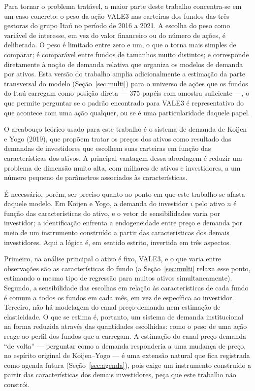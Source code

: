 \documentclass[12pt,a4paper]{article}
\begin{document}
Para tornar o problema tratável, a maior parte deste trabalho concentra-se em um caso concreto:
o peso da ação VALE3 nas carteiras dos fundos das três gestoras do grupo Itaú no período de 2016
a 2021. A escolha do peso como variável de interesse, em vez do valor financeiro ou do número de
ações, é deliberada. O peso é limitado entre zero e um, o que o torna mais simples de comparar;
é comparável entre fundos de tamanhos muito distintos; e corresponde diretamente à noção de
demanda relativa que organiza os modelos de demanda por ativos. Esta versão do trabalho amplia
adicionalmente a estimação da parte transversal do modelo (Seção~\ref{sec:multi}) para o
universo de ações que os fundos do Itaú carregam como posição direta --- 375 papéis com amostra
suficiente ---, o que permite perguntar se o padrão encontrado para VALE3 é representativo do
que acontece com uma ação qualquer, ou se é uma particularidade daquele papel.

O arcabouço teórico usado para este trabalho é o sistema de demanda de Koijen e Yogo (2019),
que propõem tratar os preços dos ativos como resultado das demandas de investidores que
escolhem suas carteiras em função das características dos ativos. A principal vantagem dessa
abordagem é reduzir um problema de dimensão muito alta, com milhares de ativos e investidores,
a um número pequeno de parâmetros associados às características.

É necessário, porém, ser preciso quanto ao ponto em que este trabalho se afasta daquele
modelo. Em Koijen e Yogo, a demanda do investidor $i$ pelo ativo $n$ é função das
características do ativo, e o vetor de sensibilidades varia por investidor; a identificação
enfrenta a endogeneidade entre preço e demanda por meio de um instrumento construído a partir
das características dos demais investidores. Aqui a lógica é, em sentido estrito, invertida em
três aspectos.

Primeiro, na análise principal o ativo é fixo, VALE3, e o que varia entre observações são as
características do fundo (a Seção~\ref{sec:multi} relaxa esse ponto, estimando o mesmo tipo de
regressão para muitos ativos simultaneamente). Segundo, a sensibilidade das escolhas em relação
às características de cada fundo é comum a todos os fundos em cada mês, em vez de específica ao
investidor. Terceiro, não há modelagem do canal preço-demanda nem estimação de elasticidade. O
que se estima é, portanto, um sistema de demanda institucional na forma reduzida através das
quantidades escolhidas: como o peso de uma ação reage ao perfil dos fundos que a carregam. A
estimação do canal preço-demanda ``de volta'' --- perguntar como a demanda responderia a uma
mudança de preço, no espírito original de Koijen--Yogo --- é uma extensão natural que fica
registrada como agenda futura (Seção~\ref{sec:agenda}), pois exige um instrumento construído a
partir das características dos demais investidores, peça que este trabalho não constrói.
\end{document}

